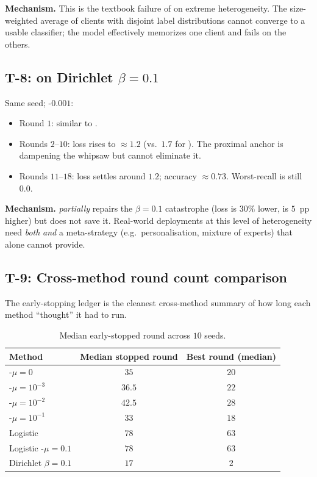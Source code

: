 \textbf{Mechanism.} This is the textbook failure of \fedavg{} on
extreme heterogeneity. The size-weighted average of clients with
disjoint label distributions cannot converge to a usable
classifier; the model effectively memorizes one client and
fails on the others.

\subsection{T-8: \fedprox{} on Dirichlet $\beta\!=\!0.1$}

Same seed; \fedprox{}-$0.001$:

\begin{itemize}[leftmargin=1.5em, itemsep=2pt, topsep=2pt]
    \item Round $1$: similar to \fedavg{}.
    \item Rounds $2$--$10$: loss rises to $\approx 1.2$ (vs.\
        $1.7$ for \fedavg{}). The proximal anchor is dampening
        the whipsaw but cannot eliminate it.
    \item Rounds $11$--$18$: loss settles around $1.2$; accuracy
        $\approx 0.73$. Worst-recall is still $0.0$.
\end{itemize}

\textbf{Mechanism.} \fedprox{} \emph{partially} repairs the
$\beta\!=\!0.1$ catastrophe (loss is $30\%$ lower, \auprc{} is
$5$~pp higher) but does not save it. Real-world deployments at
this level of heterogeneity need \emph{both} \fedprox{} \emph{and}
a meta-strategy (e.g.\ personalisation, mixture of experts) that
\fedprox{} alone cannot provide.

\subsection{T-9: Cross-method round count comparison}

The early-stopping ledger is the cleanest cross-method summary of
how long each method ``thought'' it had to run.

\begin{table}[h]
\centering
\caption{Median early-stopped round across $10$ seeds.}
\label{tab:stopped-round}
\small
\begin{tabular}{l c c}
\toprule
Method & Median stopped round & Best round (median) \\
\midrule
\fedprox{}-$\mu\!=\!0$       & $35$ & $20$ \\
\fedprox{}-$\mu\!=\!10^{-3}$ & $36.5$ & $22$ \\
\fedprox{}-$\mu\!=\!10^{-2}$ & $42.5$ & $28$ \\
\fedprox{}-$\mu\!=\!10^{-1}$ & $33$ & $18$ \\
Logistic \fedavg{}            & $78$ & $63$ \\
Logistic \fedprox{}-$\mu\!=\!0.1$ & $78$ & $63$ \\
Dirichlet $\beta\!=\!0.1$ \fedavg{} & $17$ & $2$ \\
\bottomrule
\end{tabular}
\end{table}

